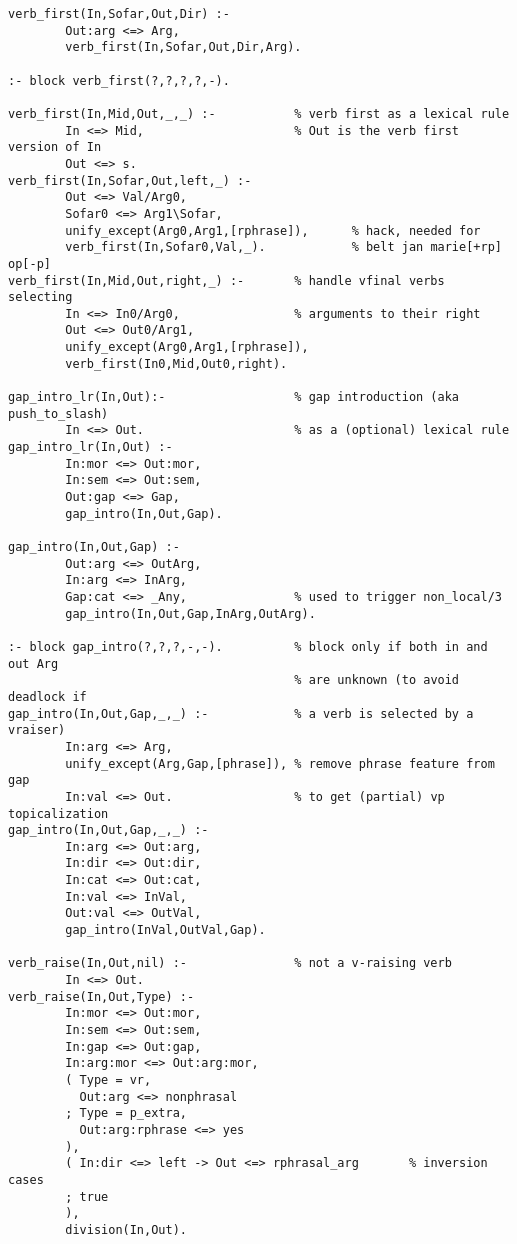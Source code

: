 \begin{verbatim}
verb_first(In,Sofar,Out,Dir) :- 
        Out:arg <=> Arg,
        verb_first(In,Sofar,Out,Dir,Arg).
        
:- block verb_first(?,?,?,?,-).

verb_first(In,Mid,Out,_,_) :-           % verb first as a lexical rule   
        In <=> Mid,                     % Out is the verb first version of In
        Out <=> s.
verb_first(In,Sofar,Out,left,_) :-
        Out <=> Val/Arg0,
        Sofar0 <=> Arg1\Sofar,
        unify_except(Arg0,Arg1,[rphrase]),      % hack, needed for
        verb_first(In,Sofar0,Val,_).            % belt jan marie[+rp] op[-p]
verb_first(In,Mid,Out,right,_) :-       % handle vfinal verbs selecting 
        In <=> In0/Arg0,                % arguments to their right
        Out <=> Out0/Arg1,
        unify_except(Arg0,Arg1,[rphrase]),
        verb_first(In0,Mid,Out0,right).
                
gap_intro_lr(In,Out):-                  % gap introduction (aka push_to_slash)
        In <=> Out.                     % as a (optional) lexical rule
gap_intro_lr(In,Out) :-                 
        In:mor <=> Out:mor,
        In:sem <=> Out:sem,
        Out:gap <=> Gap,
        gap_intro(In,Out,Gap).          
        
gap_intro(In,Out,Gap) :-
        Out:arg <=> OutArg,
        In:arg <=> InArg,
        Gap:cat <=> _Any,               % used to trigger non_local/3
        gap_intro(In,Out,Gap,InArg,OutArg).
        
:- block gap_intro(?,?,?,-,-).          % block only if both in and out Arg
                                        % are unknown (to avoid deadlock if
gap_intro(In,Out,Gap,_,_) :-            % a verb is selected by a vraiser)      
        In:arg <=> Arg,                 
        unify_except(Arg,Gap,[phrase]), % remove phrase feature from gap
        In:val <=> Out.                 % to get (partial) vp topicalization
gap_intro(In,Out,Gap,_,_) :-
        In:arg <=> Out:arg,
        In:dir <=> Out:dir,
        In:cat <=> Out:cat,
        In:val <=> InVal,
        Out:val <=> OutVal,
        gap_intro(InVal,OutVal,Gap).
        
verb_raise(In,Out,nil) :-               % not a v-raising verb
        In <=> Out.
verb_raise(In,Out,Type) :-
        In:mor <=> Out:mor,
        In:sem <=> Out:sem,
        In:gap <=> Out:gap,
        In:arg:mor <=> Out:arg:mor,
        ( Type = vr,            
          Out:arg <=> nonphrasal
        ; Type = p_extra,       
          Out:arg:rphrase <=> yes
        ),
        ( In:dir <=> left -> Out <=> rphrasal_arg       % inversion cases
        ; true
        ),
        division(In,Out).
        

\end{verbatim}

